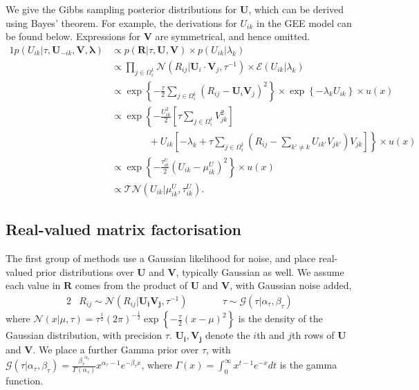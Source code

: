 \documentclass{article}
\newcommand{\R}{\boldsymbol R}
\newcommand{\U}{\boldsymbol U}
\newcommand{\Ui}{\boldsymbol{U_i}}
\newcommand{\V}{\boldsymbol V}
\newcommand{\Vj}{\boldsymbol{V_j}}
\newcommand{\muUik}{\mu_{ik}^U}
\newcommand{\tauUik}{\tau_{ik}^U}
\newcommand{\sumexclk}{\sum_{k' \neq k}}
\newcommand{\diffexclk}{( R_{ij} - \sumexclk U_{ik'} V_{jk'} ) }
\begin{document}
		We give the Gibbs sampling posterior distributions for $\U$, which can be derived using Bayes' theorem. For example, the derivations for $U_{ik}$ in the GEE model can be found below. Expressions for $\V$ are symmetrical, and hence omitted. 
		\begin{alignat*}{1}
			p(U_{ik}|\tau,\U_{-ik},\V,\boldsymbol \lambda) 
			&\propto p(\R|\tau,\U,\V) \times p(U_{ik}|\lambda_k) \\
			&\propto \prod_{j \in \Omega^1_i} \mathcal{N} (R_{ij} | \U_i \cdot \V_j, \tau^{-1} ) \times \mathcal{E} ( U_{ik} | \lambda_k) \\
			&\propto \exp \left\{ - \frac{\tau}{2} \sum_{j \in \Omega^1_i} (R_{ij} - \U_i \V_j)^2 \right\} \times \exp \left\{ - \lambda_k U_{ik} \right\} \times u(x) \\
			&\propto \exp \left\{ - \frac{U_{ik}^2}{2} \left[ \displaystyle \tau \sum_{j \in \Omega^1_i} V_{jk}^2 \right] \right. \\
			& \left. \hspace{46pt} + U_{ik} \left[ - \lambda_k + \tau \sum_{j \in \Omega^1_i} \diffexclk V_{jk} \right] \right\} \times u(x) \\
			&\propto \exp \left\{ - \frac{\tauUik}{2} ( U_{ik} - \muUik )^2 \right\} \times u(x) \\
			&\propto \mathcal{TN} ( U_{ik} | \muUik, \tauUik ).
		\end{alignat*}
	
		\subsection{Real-valued matrix factorisation}
		The first group of methods use a Gaussian likelihood for noise, and place real-valued prior distributions over $\U$ and $\V$, typically Gaussian as well. We assume each value in $\R$ comes from the product of $\U$ and $\V$, with Gaussian noise added,
		\begin{alignat*}{2}
			&R_{ij} \sim \mathcal{N} (R_{ij} | \Ui \Vj, \tau^{-1} )	 \quad\quad		&&\tau \sim \mathcal{G} (\tau | \alpha_{\tau}, \beta_{\tau} ) 
		\end{alignat*}
		where $ \mathcal{N} (x|\mu,\tau) = \tau^{\frac{1}{2}} (2\pi)^{-\frac{1}{2}} \exp \left\{ -\frac{\tau}{2} (x - \mu)^2 \right\} $ is the density of the Gaussian distribution, with precision $ \tau $. $\Ui, \Vj$ denote the $i$th and $j$th rows of $\U$ and $\V$. We place a further Gamma prior over $\tau$, with $ \mathcal{G} (\tau | \alpha_{\tau}, \beta_{\tau} ) = \frac{{\beta_{\tau}}^{\alpha_{\tau}}}{\Gamma(\alpha_{\tau})} x^{\alpha_{\tau} -1} e^{- \beta_{\tau} x} $, where $ \Gamma(x) = \int_{0}^{\infty} x^{t-1} e^{-x} dt $ is the gamma function. 
		
\end{document}
